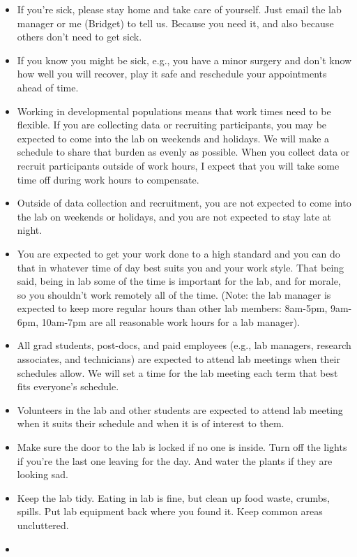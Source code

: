\documentclass[]{book}
\providecommand{\tightlist}{%
  \setlength{\itemsep}{0pt}\setlength{\parskip}{0pt}}
\begin{document}
\begin{itemize}
\tightlist
\item
  If you're sick, please stay home and take care of yourself. Just email the lab manager or me (Bridget) to tell us. Because you need it, and also because others don't need to get sick.
\item
  If you know you might be sick, e.g., you have a minor surgery and don't know how well you will recover, play it safe and reschedule your appointments ahead of time.
\item
  Working in developmental populations means that work times need to be flexible. If you are collecting data or recruiting participants, you may be expected to come into the lab on weekends and holidays. We will make a schedule to share that burden as evenly as possible. When you collect data or recruit participants outside of work hours, I expect that you will take some time off during work hours to compensate.
\item
  Outside of data collection and recruitment, you are not expected to come into the lab on weekends or holidays, and you are not expected to stay late at night.
\item
  You are expected to get your work done to a high standard and you can do that in whatever time of day best suits you and your work style. That being said, being in lab some of the time is important for the lab, and for morale, so you shouldn't work remotely all of the time. (Note: the lab manager is expected to keep more regular hours than other lab members: 8am-5pm, 9am-6pm, 10am-7pm are all reasonable work hours for a lab manager).
\item
  All grad students, post-docs, and paid employees (e.g., lab managers, research associates, and technicians) are expected to attend lab meetings when their schedules allow. We will set a time for the lab meeting each term that best fits everyone's schedule.
\item
  Volunteers in the lab and other students are expected to attend lab meeting when it suits their schedule and when it is of interest to them.
\item
  Make sure the door to the lab is locked if no one is inside. Turn off the lights if you're the last one leaving for the day. And water the plants if they are looking sad.
\item
  Keep the lab tidy. Eating in lab is fine, but clean up food waste, crumbs, spills. Put lab equipment back where you found it. Keep common areas uncluttered.
\item

\end{itemize}
\end{document}
